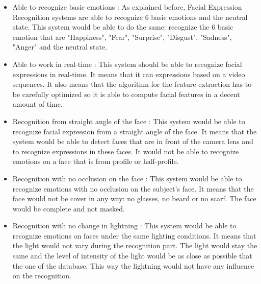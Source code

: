 \begin{itemize}
  \item Able to recognize basic emotions : 
  \noindent As explained before, Facial Expression Recognition systems are able to recognize 6 basic emotions and the neutral state. This system would be able to do the same: recognize the 6 basic emotion that are "Happiness", "Fear", "Surprise", "Disgust", "Sadness", "Anger" and the neutral state.
\newline

  \item Able to work in real-time : 
  \noindent This system should be able to recognize facial expressions in real-time. It means that it can expressions based on a video sequences. It also means that the algorithm for the feature extraction has to be carefully optimized so it is able to compute facial features in a decent amount of time. 
\newline

  \item Recognition from straight angle of the face : 
  \noindent This system would be able to recognize facial expression from a straight angle of the face. It means that the system would be able to detect faces that are in front of the camera lens and to recognize expressions in these faces. It would not be able to recognize emotions on a face that is from profile or half-profile.
\newline

  \item Recognition with no occlusion on the face : 
  \noindent This system would be able to recognize emotions with no occlusion on the subject's face. It means that the face would not be cover in any way: no glasses, no beard or no scarf. The face would be complete and not masked.
\newline

  \item Recognition with no change in lightning : 
  \noindent This system would be able to recognize emotions on faces under the same lighting conditions. It means that the light would not vary during the recognition part. The light would stay the same and the level of intensity of the light would be as close as possible that the one of the database. This way the lightning would not have any influence on the recognition.
\newline
\end{itemize}











